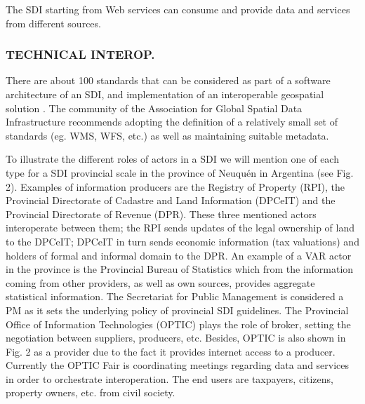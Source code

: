 \documentclass[10pt,twocolumn,ieeetran]{article}
\begin{document}
The SDI starting from Web services can consume and provide data and services from different sources.


\subsubsection{TECHNICAL INTEROP.}

There are about 100 standards that can be considered as part of a software architecture of an SDI, and implementation of an interoperable geospatial solution \cite{Masser}.
The community of the Association for Global Spatial Data Infrastructure recommends adopting the definition of a relatively small set of standards (eg. WMS, WFS, etc.) as well as maintaining suitable metadata.

To illustrate the different roles of actors in a SDI we will mention one of each type for a SDI provincial scale in the province of Neuqu\' en in Argentina (see Fig. 2). Examples of information producers are the Registry of Property (RPI), the Provincial Directorate of Cadastre and Land Information (DPCeIT) and the Provincial Directorate of Revenue (DPR).
These three  mentioned actors  interoperate between them; the RPI sends updates of the legal ownership of land to the  DPCeIT; DPCeIT in turn sends economic information (tax valuations) and holders of formal and informal domain to the DPR. An example of a VAR actor in the province is the Provincial Bureau of Statistics which from the information coming from other providers, as well as own sources, provides  aggregate statistical information.
The Secretariat for Public Management is considered a PM as it sets  the underlying policy of provincial SDI guidelines. The Provincial Office of Information Technologies (OPTIC) plays the role of broker, setting the negotiation between suppliers, producers, etc. Besides, OPTIC is also shown in Fig. 2 as a provider due to the fact it provides internet access to a producer. Currently the OPTIC Fair is coordinating meetings regarding  data and services in order to orchestrate interoperation. The end users are taxpayers, citizens, property owners, etc.  from civil society.
\end{document}
